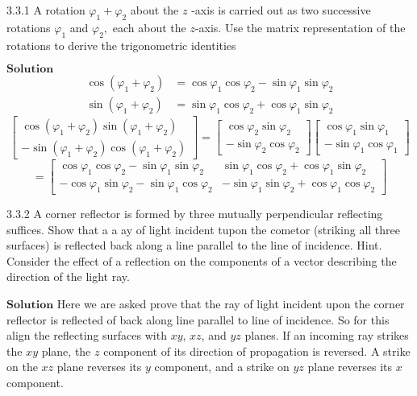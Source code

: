 \documentclass{styles/kaobook}
\begin{document}
\begin{greenbox}{3.3.1}
A rotation $\varphi_{1}+\varphi_{2}$ about the $z$ -axis is carried out as two successive rotations $\varphi_{1}$ and $\varphi_{2},$ each about the $z$-axis. Use the matrix representation of the rotations to derive the trigonometric identities
\end{greenbox}
$\boxed{\textbf{Solution}}$
$$
\begin{aligned} \cos \left(\varphi_{1}+\varphi_{2}\right) &=\cos \varphi_{1} \cos \varphi_{2}-\sin \varphi_{1} \sin \varphi_{2} \\ \sin \left(\varphi_{1}+\varphi_{2}\right) &=\sin \varphi_{1} \cos \varphi_{2}+\cos \varphi_{1} \sin \varphi_{2} \end{aligned}
$$
$$\begin{bmatrix}{\cos \left(\varphi_{1}+\varphi_{2}\right) \sin \left(\varphi_{1}+\varphi_{2}\right)} \\ {-\sin \left(\varphi_{1}+\varphi_{2}\right) \cos \left(\varphi_{1}+\varphi_{2}\right)}\end{bmatrix}=\begin{bmatrix}{\cos \varphi_{2} \sin \varphi_{2}} \\ {-\sin \varphi_{2} \cos \varphi_{2}}\end{bmatrix}\begin{bmatrix}{\cos \varphi_{1} \sin \varphi_{1}} \\ {-\sin \varphi_{1} \cos \varphi_{1}}\end{bmatrix}$$
$$=\begin{bmatrix}{\cos \varphi_{1} \cos \varphi_{2}-\sin \varphi_{1} \sin \varphi_{2}} & {\sin \varphi_{1} \cos \varphi_{2}+\cos \varphi_{1} \sin \varphi_{2}} \\ {-\cos \varphi_{1} \sin \varphi_{2}-\sin \varphi_{1} \cos \varphi_{2}} & {-\sin \varphi_{1} \sin \varphi_{2}+\cos \varphi_{1} \cos \varphi_{2}}\end{bmatrix}$$


\begin{greenbox}{3.3.2}
A corner reflector is formed by three mutually perpendicular reflecting suffices. Show that a a ay of light incident tupon the cometor (striking all three surfaces) is reflected back along a line parallel to the line of incidence. Hint. Consider the effect of a reflection on the components of a vector describing the direction of the light ray.
\end{greenbox}
$\boxed{\textbf{Solution}}$ Here we are asked prove that the ray of light incident upon the corner reflector is reflected of back along line parallel to line of incidence.
So for this align the reflecting surfaces with $xy$, $xz$, and $yz$ planes. If an incoming ray strikes the $xy$ plane, the $z$ component of its direction of propagation is reversed. A strike on the $xz$ plane
reverses its $y$ component, and a strike on $yz$ plane reverses its $x$ component.
\end{document}
